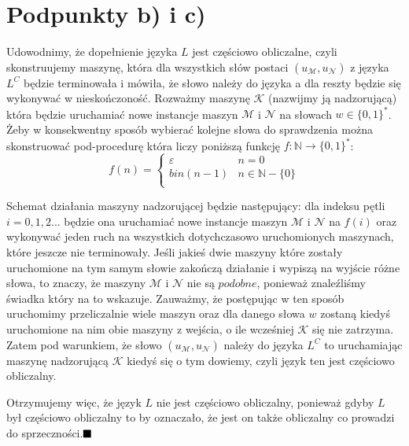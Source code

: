 \documentclass{article}
\begin{document}
\section{Podpunkty b) i c)}

Udowodnimy, że dopełnienie języka $L$ jest częściowo obliczalne, czyli skonstruujemy maszynę, która dla wszystkich słów postaci $(u_{\mathcal{M}}, u_{\mathcal{N}})$ z języka $L^C$ będzie terminowała i mówiła, że słowo należy do języka a dla reszty będzie się wykonywać w nieskończoność. Rozważmy maszynę $\mathcal{K}$ (nazwijmy ją nadzorującą) która będzie uruchamiać nowe instancje maszyn $\mathcal{M}$ i $\mathcal{N}$ na słowach $w \in \{0,1\}^*$. Żeby w konsekwentny sposób wybierać kolejne słowa do sprawdzenia można skonstruować pod-procedurę która liczy poniższą funkcję $f: \mathbb{N} \rightarrow \{0,1\}^*$:
$$
f(n) = \begin{cases}
\varepsilon & n = 0 \\
bin(n-1) & n \in \mathbb{N}-\{0\} \\
\end{cases}
$$

Schemat działania maszyny nadzorującej będzie następujący: dla indeksu pętli $i=0,1,2\ldots $ będzie ona uruchamiać nowe instancje maszyn $\mathcal{M}$ i $\mathcal{N}$ na $f(i)$ oraz wykonywać jeden ruch na wszystkich dotychczasowo uruchomionych maszynach, które jeszcze nie terminowały. Jeśli jakieś dwie maszyny które zostały uruchomione na tym samym słowie zakończą działanie i wypiszą na wyjście różne słowa, to znaczy, że maszyny $\mathcal{M}$ i $\mathcal{N}$ nie są $podobne$, ponieważ znaleźliśmy świadka który na to wskazuje. Zauważmy, że postępując w ten sposób uruchomimy przeliczalnie wiele maszyn oraz dla danego słowa $w$ zostaną kiedyś uruchomione na nim obie maszyny z wejścia, o ile wcześniej $\mathcal{K}$ się nie zatrzyma. Zatem pod warunkiem, że słowo $(u_{\mathcal{M}}, u_{\mathcal{N}})$ należy do języka $L^C$ to uruchamiając maszynę nadzorującą $\mathcal{K}$ kiedyś się o tym dowiemy, czyli język ten jest częściowo obliczalny.
\hfill \break

Otrzymujemy więc, że język $L$ nie jest częściowo obliczalny, ponieważ gdyby $L$ był częściowo obliczalny to by oznaczało, że jest on także obliczalny co prowadzi do sprzeczności.$ \hfill \blacksquare$
\end{document}
